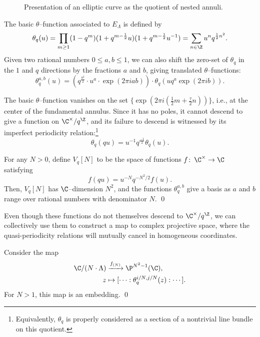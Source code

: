\begin{figure}
\begin{center}
\end{center}
\caption{Presentation of an elliptic curve as the quotient of nested annuli.}\label{AnnulusPicture}
\end{figure}

\begin{definition}
The basic \(\theta\)--function associated to \(E_\Lambda\) is defined by \[\theta_q(u) = \prod_{m \ge 1} (1 - q^m) (1 + q^{m-\frac{1}{2}}u) (1 + q^{m-\frac{1}{2}}u^{-1}) = \sum_{n \in \Z} u^n q^{\frac{1}{2} n^2}.\]  Given two rational numbers \(0 \le a, b \le 1\), we can also shift the zero-set of \(\theta_q\) in the \(1\) and \(q\) directions by the fractions \(a\) and \(b\), giving translated \(\theta\)--functions: \[\theta_q^{a,b}(u) = \left(q^{\frac{a^2}{2}} \cdot u^a \cdot \exp(2 \pi i a b) \right) \cdot \theta_q(u q^a \exp(2 \pi i b)).\]
\end{definition}

The basic \(\theta\)--function vanishes on the set \(\{\exp(2 \pi i (\frac{1}{2}m + \frac{\tau}{2}n))\}\), i.e., at the center of the fundamental annulus.  Since it has no poles, it cannot descend to give a function on \(\C^\times / q^{\Z}\), and its failure to descend is witnessed by its imperfect periodicity relation:\footnote{Equivalently, \(\theta_q\) is properly considered as a section of a nontrivial line bundle on this quotient.} \[\theta_q(qu) = u^{-1} q^{\frac{-1}{2}} \theta_q(u).\]

\begin{lemma}
For any \(N > 0\), define \(V_q[N]\) to be the space of functions \(f\co \C^\times \to \C\) satisfying \[f(q u) = u^{-N}  q^{-N^2/2} f(u).\]  Then, \(V_q[N]\) has \(\C\)--dimension \(N^2\), and the functions \(\theta_q^{a, b}\) give a basis as \(a\) and \(b\) range over rational numbers with denominator \(N\). \qed
\end{lemma}

Even though these functions do not themselves descend to \(\C^\times / q^{\Z}\), we can collectively use them to construct a map to complex projective space, where the quasi-periodicity relations will mutually cancel in homogeneous coordinates.
\begin{theorem}
Consider the map
\begin{align*}
\C / (N \cdot \Lambda) & \xrightarrow{f_{(N)}} \P^{N^2-1}(\C), \\
z & \mapsto [\cdots : \theta_q^{i/N, j/N}(z) : \cdots].
\end{align*}
For \(N > 1\), this map is an embedding. \qed
\end{theorem}


